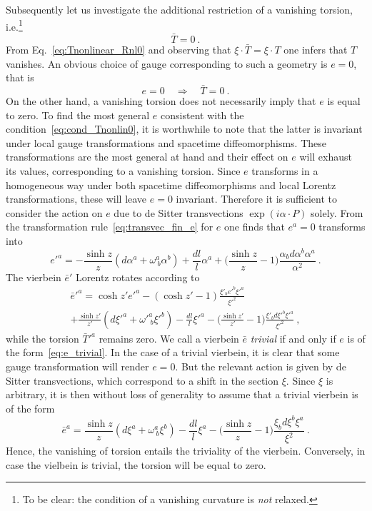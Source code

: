 \documentclass[11pt]{article}
\begin{document}
Subsequently let us investigate the additional restriction of a 
vanishing torsion, i.e.\footnote{To be clear: the condition of a 
	vanishing curvature is \emph{not} relaxed.}
\begin{equation}
	\label{eq:cond_Tnonlin0}
	\bar{T} = 0~.
\end{equation}
From Eq.~\eqref{eq:Tnonlinear_Rnl0} and observing that 
$\xi\cdot\bar{T} = \xi\cdot T$ one infers that $T$ vanishes. An 
obvious choice of gauge corresponding to such a geometry is $e = 
0$, that is
\begin{displaymath}
	e = 0 \quad\Rightarrow\quad \bar{T} = 0~.
\end{displaymath}
On the other hand, a vanishing torsion does not necessarily imply 
that $e$ is equal to zero. To find the most general $e$ 
consistent with the condition~\eqref{eq:cond_Tnonlin0}, it is 
worthwhile to note that the latter is invariant under local gauge 
transformations and spacetime diffeomorphisms.  These 
transformations are the most general at hand and their effect on 
$e$ will exhaust its values, corresponding to a vanishing 
torsion.  Since $e$ transforms in a homogeneous way under both 
spacetime diffeomorphisms and local Lorentz transformations, 
these will leave $e=0$ invariant. Therefore it is sufficient to 
consider the action on $e$ due to de Sitter transvections 
$\exp(i\alpha\cdot P)$ solely.  From the transformation 
rule~\eqref{eq:transvec_fin_e} for $e$ one finds that $e^a = 0$ 
transforms into
\begin{equation}
	\label{eq:e_trivial}
	e'^a = -\frac{\sinh z}{z} (d\alpha^a + \omega^a_{~b}\alpha^b) + 
	\frac{dl}{l} \alpha^a + \bigg( \frac{\sinh z}{z} - 1 \bigg) 
	\frac{\alpha_b d\alpha^b \alpha^a}{\alpha^2}~.
\end{equation}
The vierbein $\bar{e}'$ Lorentz rotates according 
to
\begin{multline*}
	\bar{e}'^a = \cosh z' e'^a - (\cosh z' -1) \frac{\xi'_b e'^b 
		\xi'^a}{\xi'^2}
	\\
	+ \frac{\sinh z'}{z'}(d\xi'^a + \omega'^a_{~b}\xi'^b) - 
	\frac{dl}{l} \xi'^a - \bigg( \frac{\sinh z'}{z'} - 1 \bigg) 
	\frac{\xi'_b d\xi'^b \xi'^a}{\xi'^2}~,
\end{multline*}
while the torsion $\bar{T}'^a$ remains zero. We call a vierbein 
$\bar{e}$ \emph{trivial} if and only if $e$ is of the 
form~\eqref{eq:e_trivial}. In the case of a trivial vierbein, it 
is clear that some gauge transformation will render $e = 0$. But 
the relevant action is given by de Sitter transvections, which 
correspond to a shift in the section $\xi$.
Since $\xi$ is arbitrary, it is then without loss of generality 
to assume that a trivial vierbein is of the form
\begin{equation}
	\bar{e}^a = \frac{\sinh z}{z}(d\xi^a + \omega^a_{~b}\xi^b) - 
	\frac{dl}{l} \xi^a - \bigg( \frac{\sinh z}{z} - 1 \bigg) 
	\frac{\xi_b d\xi^b \xi^a}{\xi^2}~.
\end{equation}
Hence, the vanishing of torsion entails the triviality of the 
vierbein. Conversely, in case the vielbein is trivial, the 
torsion will be equal to zero.
\end{document}
